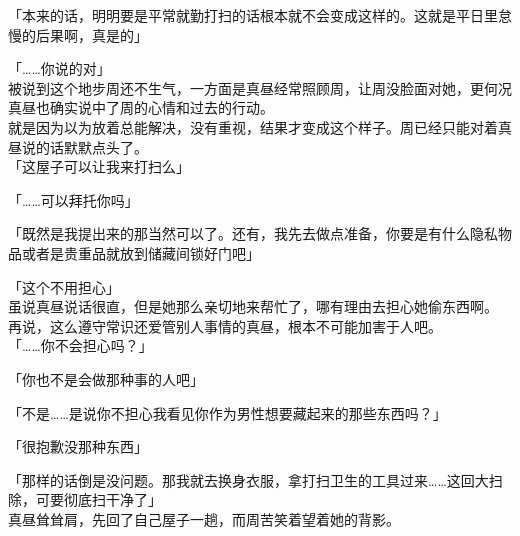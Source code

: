 「本来的话，明明要是平常就勤打扫的话根本就不会变成这样的。这就是平日里怠慢的后果啊，真是的」

「……你说的对」\\

被说到这个地步周还不生气，一方面是真昼经常照顾周，让周没脸面对她，更何况真昼也确实说中了周的心情和过去的行动。\\

就是因为以为放着总能解决，没有重视，结果才变成这个样子。周已经只能对着真昼说的话默默点头了。\\

「这屋子可以让我来打扫么」

「……可以拜托你吗」

「既然是我提出来的那当然可以了。还有，我先去做点准备，你要是有什么隐私物品或者是贵重品就放到储藏间锁好门吧」

「这个不用担心」\\

虽说真昼说话很直，但是她那么亲切地来帮忙了，哪有理由去担心她偷东西啊。\\

再说，这么遵守常识还爱管别人事情的真昼，根本不可能加害于人吧。\\

「……你不会担心吗？」

「你也不是会做那种事的人吧」

「不是……是说你不担心我看见你作为男性想要藏起来的那些东西吗？」

「很抱歉没那种东西」

「那样的话倒是没问题。那我就去换身衣服，拿打扫卫生的工具过来……这回大扫除，可要彻底扫干净了」\\

真昼耸耸肩，先回了自己屋子一趟，而周苦笑着望着她的背影。
